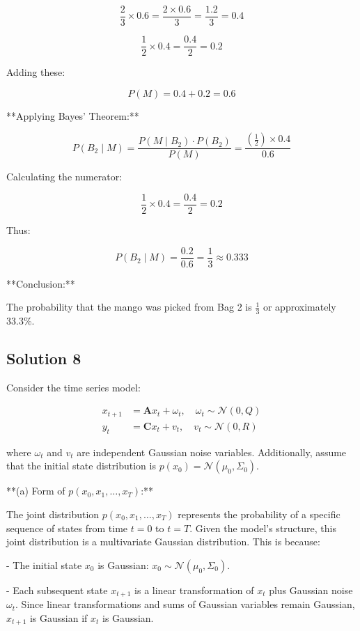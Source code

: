 \documentclass[12pt]{article}
\begin{document}
   \[
   \frac{2}{3} \times 0.6 = \frac{2 \times 0.6}{3} = \frac{1.2}{3} = 0.4
   \]

   \[
   \frac{1}{2} \times 0.4 = \frac{0.4}{2} = 0.2
   \]

   Adding these:

   \[
   P(M) = 0.4 + 0.2 = 0.6
   \]

**Applying Bayes' Theorem:**

\[
P(B_2 \mid M) = \frac{P(M \mid B_2) \cdot P(B_2)}{P(M)} = \frac{\left( \frac{1}{2} \right) \times 0.4}{0.6}
\]

Calculating the numerator:

\[
\frac{1}{2} \times 0.4 = \frac{0.4}{2} = 0.2
\]

Thus:

\[
P(B_2 \mid M) = \frac{0.2}{0.6} = \frac{1}{3} \approx 0.333
\]

**Conclusion:**

The probability that the mango was picked from Bag 2 is \( \frac{1}{3} \) or approximately 33.3\%.


\subsection*{Solution 8}

Consider the time series model:

\[
\begin{aligned}
    x_{t+1} &= \mathbf{A} x_t + \omega_t, \quad \omega_t \sim \mathcal{N}(0, Q) \\
    y_t &= \mathbf{C} x_t + v_t, \quad v_t \sim \mathcal{N}(0, R)
\end{aligned}
\]

where \( \omega_t \) and \( v_t \) are independent Gaussian noise variables. Additionally, assume that the initial state distribution is \( p(x_0) = \mathcal{N}(\mu_0, \Sigma_0) \).

**(a) Form of \( p(x_0, x_1, \dots, x_T) \):**

The joint distribution \( p(x_0, x_1, \dots, x_T) \) represents the probability of a specific sequence of states from time \( t = 0 \) to \( t = T \). Given the model's structure, this joint distribution is a multivariate Gaussian distribution. This is because:

- The initial state \( x_0 \) is Gaussian: \( x_0 \sim \mathcal{N}(\mu_0, \Sigma_0) \).

- Each subsequent state \( x_{t+1} \) is a linear transformation of \( x_t \) plus Gaussian noise \( \omega_t \). Since linear transformations and sums of Gaussian variables remain Gaussian, \( x_{t+1} \) is Gaussian if \( x_t \) is Gaussian.
\end{document}
